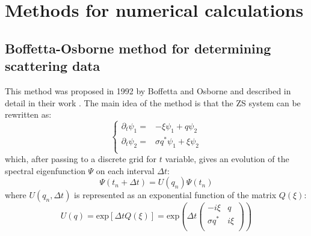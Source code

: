 \section{Methods for numerical calculations}
\label{sec:nft_numerical}

\subsection{Boffetta-Osborne method for determining scattering data}

This method was proposed in 1992 by Boffetta and Osborne and described in detail in their work \cite{osborne1992}. The main idea of the method is that the ZS system can be rewritten as:
\begin{equation}
    \left\{
    \begin{aligned}
        \partial_{t} \psi_1 = & - \xi \psi_1 + q \psi_2 \\
        \partial_{t} \psi_2 = & \sigma q^{*} \psi_1 + \xi \psi_2 \\
    \end{aligned}
    \right.
\end{equation}
which, after passing to a discrete grid for $ t $ variable, gives an evolution of the spectral eigenfunction $ \Psi $ on each interval $ \Delta t $:
\begin{equation}
    \Psi(t_n+\Delta t) = U(q_n)\Psi(t_n)
    \label{eq:bo_prop_0}
\end{equation}
where $ U (q_n, \Delta t) $ is represented as an exponential function of the matrix $ Q (\xi) $:
\begin{equation}
    U(q)=\mathrm{exp} [\Delta t Q(\xi)] = \mathrm{exp} \left( \Delta t
    \begin{pmatrix}
        -i \xi & q \\
        \sigma q^{*} & i \xi \\
    \end{pmatrix} \right)
    \label{eq:bo_prop_1}
\end{equation}

